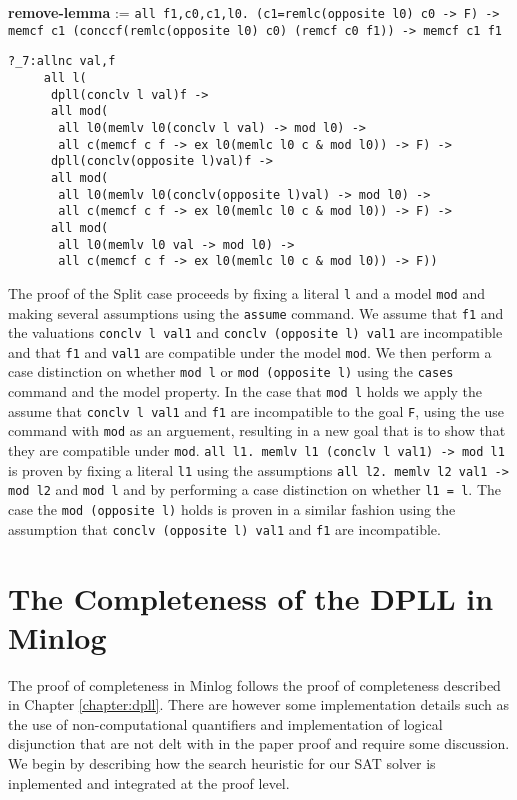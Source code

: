 \begin{center}
\textbf{remove-lemma} := \texttt{all f1,c0,c1,l0. (c1=remlc(opposite l0) c0 -> F) -> memcf c1 (conccf(remlc(opposite l0) c0) (remcf c0 f1)) -> memcf c1 f1}  
\end{center}

\begin{lstlisting}[caption = "The Split Case in Minlog"]
?_7:allnc val,f
     all l(
      dpll(conclv l val)f ->
      all mod(
       all l0(memlv l0(conclv l val) -> mod l0) ->
       all c(memcf c f -> ex l0(memlc l0 c & mod l0)) -> F) ->
      dpll(conclv(opposite l)val)f ->
      all mod(
       all l0(memlv l0(conclv(opposite l)val) -> mod l0) ->
       all c(memcf c f -> ex l0(memlc l0 c & mod l0)) -> F) ->
      all mod(
       all l0(memlv l0 val -> mod l0) ->
       all c(memcf c f -> ex l0(memlc l0 c & mod l0)) -> F))
\end{lstlisting}

The proof of the Split case proceeds by fixing a literal \texttt{l} and a model \texttt{mod} and making several assumptions using the \texttt{assume} command. We assume that \texttt{f1} and the valuations \texttt{conclv l val1} and \texttt{conclv (opposite l) val1} are incompatible and that \texttt{f1} and \texttt{val1} are compatible under the model \texttt{mod}. We then perform a case distinction on whether \texttt{mod l}  or \texttt{mod (opposite l)} using the \texttt{cases} command and the model property. In the case that \texttt{mod l} holds we apply the assume that \texttt{conclv l val1} and \texttt{f1} are incompatible  to the goal \texttt{F}, using the use  command with \texttt{mod} as an arguement, resulting in a new goal that is to show that they are compatible under \texttt{mod}. \texttt{all l1. memlv l1 (conclv l val1) -> mod l1} is proven by fixing a literal \texttt{l1} using the assumptions \texttt{all l2. memlv l2 val1 -> mod l2} and \texttt{mod l} and by performing a case distinction on whether \texttt{l1 = l}. The case the \texttt{mod (opposite l)} holds is proven in a similar fashion using the assumption that \texttt{conclv (opposite l) val1} and \texttt{f1} are incompatible.




\section{The Completeness of the DPLL in Minlog}
The proof of completeness in Minlog follows the proof of completeness described in Chapter \ref{chapter:dpll}. There are however some implementation details such as the use of non-computational quantifiers and implementation of logical disjunction that are not delt with in the paper proof and require some discussion. We begin by describing how the search heuristic for our SAT solver is inplemented and integrated at the proof level.



